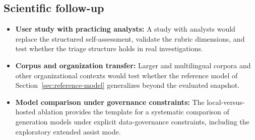 \subsection*{Scientific follow-up}
\enlargethispage{3\baselineskip}

\begin{itemize}
    \item \textbf{User study with practicing analysts:} A study with
          analysts would replace the structured self-assessment,
          validate the rubric dimensions, and test whether the triage
          structure holds in real investigations.
    \item \textbf{Corpus and organization transfer:} Larger and
          multilingual corpora and other organizational contexts would
          test whether the reference model of
          Section~\ref{sec:reference-model} generalizes beyond the
          evaluated snapshot.
    \item \textbf{Model comparison under governance constraints:} The
          local-versus-hosted ablation provides the template for a
          systematic comparison of generation models under explicit
          data-governance constraints, including the exploratory
          extended assist mode.
\end{itemize}
